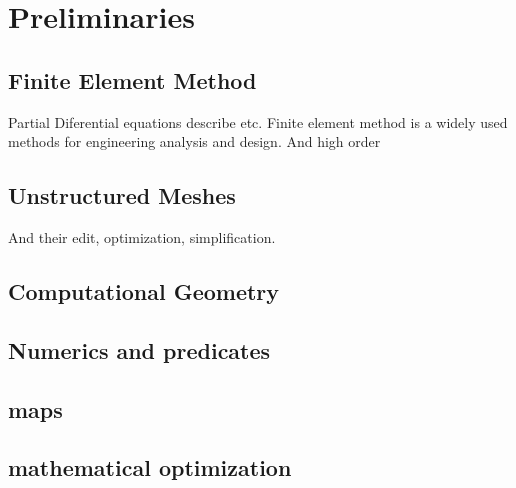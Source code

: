 \section{Preliminaries}
\subsection{Finite Element Method}
Partial Diferential equations describe etc.
Finite element method is a widely used methods for engineering analysis and design.
And high order
\subsection{Unstructured Meshes}
And their edit, optimization, simplification.
\subsection{Computational Geometry}

\subsection{Numerics and predicates}
\subsection{maps}
\subsection{mathematical optimization}
